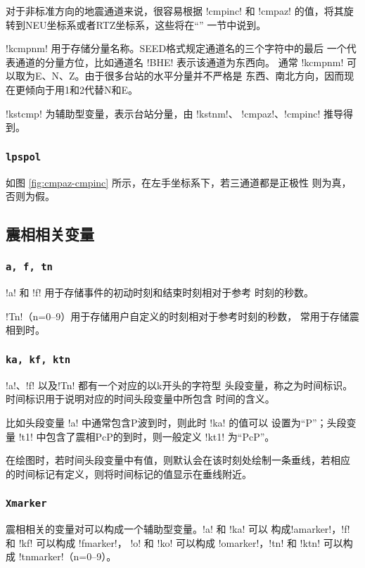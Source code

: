对于非标准方向的地震通道来说，很容易根据 !cmpinc! 和 !cmpaz!
的值，将其旋转到NEU坐标系或者RTZ坐标系，这些将在``''
一节中说到。

!kcmpnm! 用于存储分量名称。SEED格式规定通道名的三个字符中的最后
一个代表通道的分量方位，比如通道名 !BHE! 表示该通道为东西向。
通常 !kcmpnm! 可以取为E、N、Z。由于很多台站的水平分量并不严格是
东西、南北方向，因而现在更倾向于用1和2代替N和E。

!kstcmp! 为辅助型变量，表示台站分量，由 !kstnm!、
!cmpaz!、!cmpinc! 推导得到。

\subsubsection{\texttt{lpspol}}
如图 \ref{fig:cmpaz-cmpinc} 所示，在左手坐标系下，若三通道都是正极性
则为真，否则为假。

\subsection{震相相关变量}
\subsubsection{\texttt{a, f, tn}}
!a! 和 !f! 用于存储事件的初动时刻和结束时刻相对于参考
时刻的秒数。

!Tn!（n=0--9）用于存储用户自定义的时刻相对于参考时刻的秒数，
常用于存储震相到时。

\subsubsection{\texttt{ka, kf, ktn}}
!a!、!f! 以及!Tn! 都有一个对应的以k开头的字符型
头段变量，称之为时间标识。时间标识用于说明对应的时间头段变量中所包含
时间的含义。

比如头段变量 !a! 中通常包含P波到时，则此时 !ka! 的值可以
设置为``P''；头段变量 !t1! 中包含了震相PcP的到时，则一般定义
!kt1! 为``PcP''。

在绘图时，若时间头段变量中有值，则默认会在该时刻处绘制一条垂线，若相应
的时间标记有定义，则将时间标记的值显示在垂线附近。

\subsubsection{\texttt{Xmarker}}
震相相关的变量对可以构成一个辅助型变量。!a! 和 !ka! 可以
构成!amarker!，!f! 和 !kf! 可以构成 !fmarker!，
!o! 和 !ko! 可以构成 !omarker!，!tn! 和
!ktn! 可以构成 !tnmarker!（n=0--9）。


